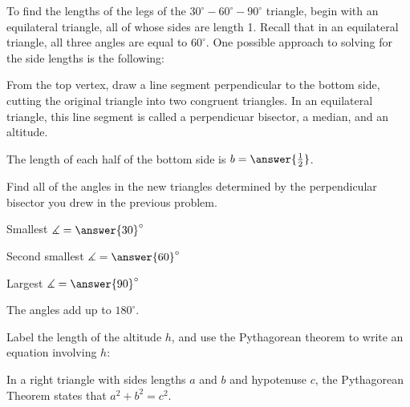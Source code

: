 \documentclass[number]{ximera}
\begin{document}
To find the lengths of the legs of the $30^\circ-60^\circ-90^\circ$ triangle, begin with an equilateral triangle, all of whose sides are length 1. 
Recall that in an equilateral triangle, all three angles are equal to $60^\circ$.
One possible approach to solving for the side lengths is the following:

\begin{image}
\end{image}

\begin{problem}
From the top vertex, draw a line segment perpendicular to the bottom side, cutting the original triangle into two congruent triangles.
In an equilateral triangle, this line segment is called a perpendicuar bisector, a median, and an altitude.

The length of each half of the bottom side is $b=\answer{\frac{1}{2}}$.
\end{problem}

\begin{problem}
Find all of the angles in the new triangles determined by the perpendicular bisector you drew in the previous problem.

Smallest $\measuredangle = \answer{30}^\circ$

Second smallest $\measuredangle = \answer{60}^\circ$

Largest $\measuredangle = \answer{90}^\circ$

\begin{hint}
The angles add up to $180^\circ$.
\end{hint}
\end{problem}

\begin{problem}
Label the length of the altitude $h$, and use the Pythagorean theorem to write an equation involving $h$:
\begin{freeResponse} %
\end{freeResponse}
\begin{hint} In a right triangle with sides lengths $a$ and $b$ and hypotenuse $c$, the Pythagorean Theorem states that $a^2+b^2=c^2$.\end{hint}
\end{problem}
\end{document}
